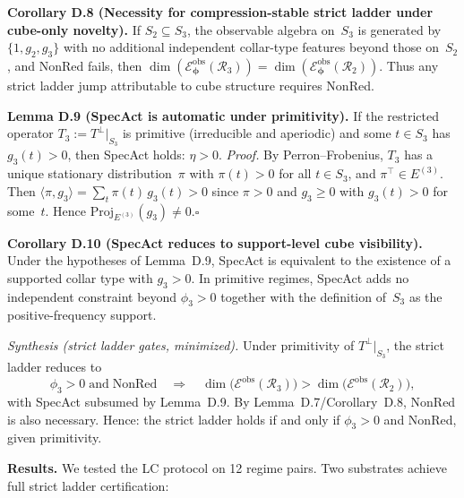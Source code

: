 \documentclass[11pt,a4paper]{article}
\theoremstyle{definition}
\theoremstyle{remark}
\begin{document}
\textbf{Corollary D.8 (Necessity for compression-stable strict ladder under cube-only novelty).}
If $S_2\subseteq S_3$, the observable algebra on~$S_3$ is generated by $\{1,g_2,g_3\}$ with no additional independent collar-type features beyond those on~$S_2$, and NonRed fails, then $\dim(\mathscr{E}^{\text{obs}}_{\boldsymbol\phi}(\mathcal{R}_3)) = \dim(\mathscr{E}^{\text{obs}}_{\boldsymbol\phi}(\mathcal{R}_2))$.
Thus any strict ladder jump attributable to cube structure requires NonRed.

\textbf{Lemma D.9 (SpecAct is automatic under primitivity).}
If the restricted operator $T_3 := T^\perp|_{S_3}$ is primitive (irreducible and aperiodic) and some $t\in S_3$ has $g_3(t) > 0$, then SpecAct holds: $\eta > 0$.
\emph{Proof.}
By Perron--Frobenius, $T_3$ has a unique stationary distribution~$\pi$ with $\pi(t) > 0$ for all $t\in S_3$, and $\pi^\top \in E^{(3)}$.
Then $\langle \pi, g_3\rangle = \sum_t \pi(t)\,g_3(t) > 0$ since $\pi > 0$ and $g_3 \geq 0$ with $g_3(t) > 0$ for some~$t$.
Hence $\mathrm{Proj}_{E^{(3)}}(g_3) \neq 0$.\quad$\square$

\textbf{Corollary D.10 (SpecAct reduces to support-level cube visibility).}
Under the hypotheses of Lemma~D.9, SpecAct is equivalent to the existence of a supported collar type with $g_3 > 0$.
In primitive regimes, SpecAct adds no independent constraint beyond $\phi_3 > 0$ together with the definition of~$S_3$ as the positive-frequency support.

\emph{Synthesis (strict ladder gates, minimized).}
Under primitivity of $T^\perp|_{S_3}$, the strict ladder reduces to
\[
\phi_3 > 0 \;\text{and}\; \mathrm{NonRed} \quad\Longrightarrow\quad
\dim\!\big(\mathscr{E}^{\text{obs}}(\mathcal{R}_3)\big) > \dim\!\big(\mathscr{E}^{\text{obs}}(\mathcal{R}_2)\big),
\]
with SpecAct subsumed by Lemma~D.9. By Lemma~D.7/Corollary~D.8, NonRed is also necessary. Hence: the strict ladder holds if and only if $\phi_3 > 0$ and NonRed, given primitivity.

\textbf{Results.} We tested the LC protocol on 12 regime pairs. Two substrates achieve full strict ladder certification:
\end{document}
